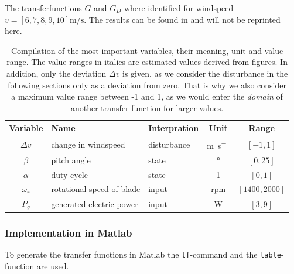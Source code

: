 The transferfunctions $G$ and $G_D$ where identified for windspeed $v=\left[6,7,8,9,10 \right] \si{\metre\per\second}$.
The results can be found in \cite[Table 2]{Fragoso_et_al_2017} and will not be reprinted here.

\begin{table}[H]
    \label{tab:analysis:import_var}
    \caption{Compilation of the most important variables, their meaning, unit and value range. The value ranges in italics are estimated values derived from figures. In addition, only the deviation $\Delta v$ is given, as we consider the disturbance in the following sections only as a deviation from zero. That is why we also consider a maximum value range between -1 and 1, as we would enter the \textit{domain} of another transfer function for larger values.}
    \centering
    \begin{tabular}{cllcc} \toprule
        Variable & Name & Interpration & Unit & Range \\ \midrule
        $\Delta v$ & change in windspeed & disturbance  & \si{\metre\per\second} & $\mathit{\left[-1,1\right]}$\\
        $\beta$ & pitch angle & state & \si{\degree}& $\left[0,25\right]$ \\
        $\alpha$ & duty cycle& state & 1 & $\left[0,1\right]$\\
        $\omega_r$ & rotational speed of blade & input & rpm & $\mathit{\left[1400,2000 \right]}$  \\
        $P_g$ &generated electric power &input & \si{\watt} &  $\mathit{\left[3,9 \right]}$\\ \bottomrule
    \end{tabular}
    \label{tab:analysis:constraints}
\end{table}

\subsubsection*{Implementation in Matlab}

To generate the transfer functions in Matlab the \texttt{tf}-command and the \texttt{table}-function are used.

